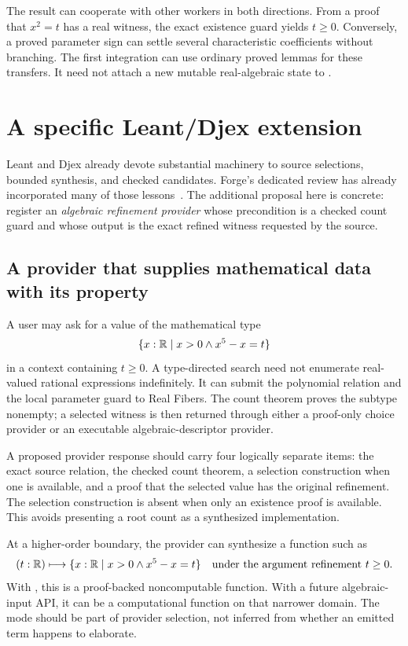 The result can cooperate with other workers in both directions. From a proof that $x^2=t$ has a real witness, the exact existence guard yields $t\geq0$. Conversely, a proved parameter sign can settle several characteristic coefficients without branching. The first integration can use ordinary proved lemmas for these transfers. It need not attach a new mutable real-algebraic state to .

\section{A specific Leant/Djex extension}\label{sec:synthesis}

Leant and Djex already devote substantial machinery to source selections, bounded synthesis, and checked candidates. Forge's dedicated review has already incorporated many of those lessons~\cite{forge,leant,djex}. The additional proposal here is concrete: register an \emph{algebraic refinement provider} whose precondition is a checked count guard and whose output is the exact refined witness requested by the source.

\subsection{A provider that supplies mathematical data with its property}

A user may ask for a value of the mathematical type
\[
\{x:\mathbb R\mid x>0\wedge x^5-x=t\}
\]
in a context containing $t\geq0$. A type-directed search need not enumerate real-valued rational expressions indefinitely. It can submit the polynomial relation and the local parameter guard to Real Fibers. The count theorem proves the subtype nonempty; a selected witness is then returned through either a proof-only choice provider or an executable algebraic-descriptor provider.

A proposed provider response should carry four logically separate items: the exact source relation, the checked count theorem, a selection construction when one is available, and a proof that the selected value has the original refinement. The selection construction is absent when only an existence proof is available. This avoids presenting a root count as a synthesized implementation.

At a higher-order boundary, the provider can synthesize a function such as
\[
(t:\mathbb R)\longmapsto\{x:\mathbb R\mid x>0\wedge x^5-x=t\}
\quad\text{under the argument refinement }t\geq0.
\]
With , this is a proof-backed noncomputable function. With a future algebraic-input API, it can be a computational function on that narrower domain. The mode should be part of provider selection, not inferred from whether an emitted term happens to elaborate.

